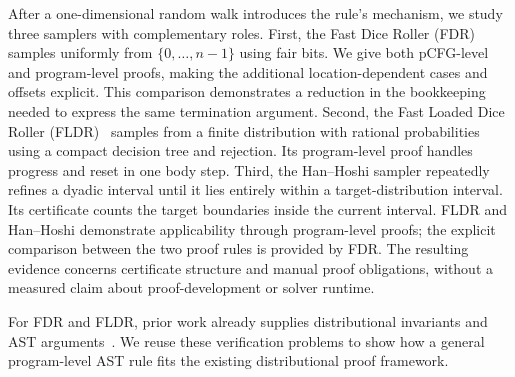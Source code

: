 After a one-dimensional random walk introduces the rule's mechanism, we study three samplers with complementary roles. First, the Fast Dice Roller (FDR)~\cite{DBLP:journals/corr/abs-1304-1916} samples uniformly from $\{0,\ldots,n-1\}$ using fair bits. We give both pCFG-level and program-level proofs, making the additional location-dependent cases and offsets explicit. This comparison demonstrates a reduction in the bookkeeping needed to express the same termination argument. Second, the Fast Loaded Dice Roller (FLDR)~\cite{DBLP:conf/aistats/SaadFRM20} samples from a finite distribution with rational probabilities using a compact decision tree and rejection. Its program-level proof handles progress and reset in one body step. Third, the Han--Hoshi sampler repeatedly refines a dyadic interval until it lies entirely within a target-distribution interval. Its certificate counts the target boundaries inside the current interval. FLDR and Han--Hoshi demonstrate applicability through program-level proofs; the explicit comparison between the two proof rules is provided by FDR. The resulting evidence concerns certificate structure and manual proof obligations, without a measured claim about proof-development or solver runtime.

For FDR and FLDR, prior work already supplies distributional invariants and AST arguments~\cite{zilken2026verifyingsamplingalgorithmsdistributional}. We reuse these verification problems to show how a general program-level AST rule fits the existing distributional proof framework.

